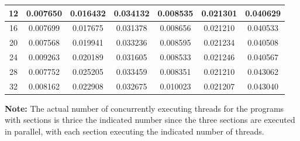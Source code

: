 \documentclass{article}
\begin{document}
\begin{table}[!htbp]
\begin{tabular}{|c|c|c|c|c|c|c|}
12                                                                & 0.007650            & 0.016432            & 0.034132            & 0.008535            & 0.021301            & 0.040629            \\ \hline
16                                                                & 0.007699            & 0.017675            & 0.031378            & 0.008656            & 0.021210            & 0.040533            \\ \hline
20                                                                & 0.007568            & 0.019941            & 0.033236            & 0.008595            & 0.021234            & 0.040508            \\ \hline
24                                                                & 0.009263            & 0.020189            & 0.031605            & 0.008533            & 0.021246            & 0.040567            \\ \hline
28                                                                & 0.007752            & 0.025205            & 0.033459            & 0.008351            & 0.021210            & 0.043062            \\ \hline
32                                                                & 0.008162            & 0.022908            & 0.032675            & 0.010023            & 0.021207            & 0.043040            \\ \hline
\end{tabular}
\end{table}

\textbf{Note:} The actual number of concurrently executing threads for the programs with sections is thrice the indicated number since the three sections are executed in parallel, with each section executing the indicated number of threads.
\end{document}
